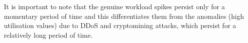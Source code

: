 It is important to note that the genuine workload spikes persist only for a momentary period of time and this differentiates them from the anomalies (high utilisation values) due to DDoS and cryptomining attacks, which persist for a relatively long period of time.

